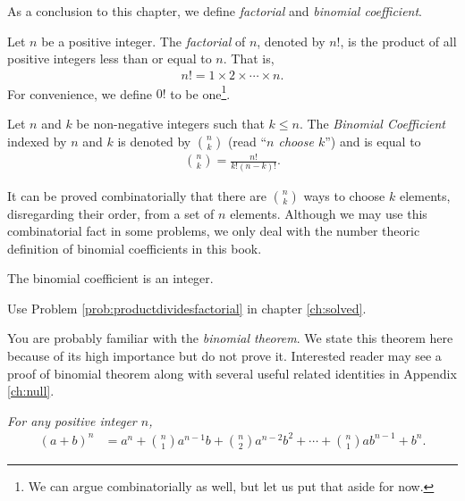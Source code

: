 \documentclass{subfile}
\begin{document}
As a conclusion to this chapter, we define \textit{factorial} and \textit{binomial coefficient}.

		\begin{definition}[Factorial]
			Let $n$ be a positive integer. The \textit{factorial} of $n$, denoted by $n!$, is the product of all positive integers less than or equal to $n$. That is,
				\begin{align*}
					n! = 1 \times 2 \times \cdots \times n.
				\end{align*}
			For convenience, we define $0!$ to be one\footnote{We can argue combinatorially as well, but let us put that aside for now.}.
		\end{definition}

		\begin{definition}
			Let $n$ and $k$ be non-negative integers such that $k \leq n$. The \textit{Binomial Coefficient} indexed by $n$ and $k$ is denoted by $\displaystyle \binom{n}{k}$ (read ``\textit{$n$ choose $k$}'') and is equal to
				\begin{align*}
					\binom{n}{k} = \frac{n!}{k!(n-k)!}.
				\end{align*}
		\end{definition}

		\begin{note}
			It can be proved combinatorially that there are $\binom{n}{k}$ ways to choose $k$ elements, disregarding their order, from a set of $n$ elements. Although we may use this combinatorial fact in some problems, we only deal with the number theoric definition of binomial coefficients in this book.
		\end{note}

		\begin{proposition}
			The binomial coefficient is an integer.
		\end{proposition}

		\begin{hint}
			Use Problem \ref{prob:productdividesfactorial} in chapter \ref{ch:solved}.
		\end{hint}
	You are probably familiar with the \textit{binomial theorem}. We state this theorem here because of its high importance but do not prove it. Interested reader may see a proof of binomial theorem along with several useful related identities in Appendix \ref{ch:null}.
		\begin{theorem}\slshape
			For any positive integer $n$,
				\begin{align*}
					(a+b)^n & = a^n+\binom{n}{1}a^{n-1}b+\binom{n}{2}a^{n-2}b^2+\cdots+\binom{n}{1}ab^{n-1}+b^n.
				\end{align*}
		\end{theorem}
\end{document}
